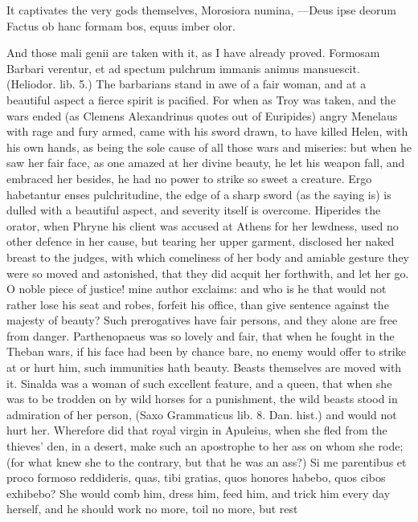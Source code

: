 {It captivates the very gods themselves, Morosiora numina,
---Deus ipse deorum
Factus ob hanc formam bos, equus imber olor.

And those mali genii are taken with it, as I have already proved.
Formosam Barbari verentur, et ad spectum pulchrum immanis animus
mansuescit. (Heliodor. lib. 5.) The barbarians stand in awe of a fair
woman, and at a beautiful aspect a fierce spirit is pacified. For when
as Troy was taken, and the wars ended (as Clemens Alexandrinus
quotes out of Euripides) angry Menelaus with rage and fury armed, came
with his sword drawn, to have killed Helen, with his own hands, as
being the sole cause of all those wars and miseries: but when he saw
her fair face, as one amazed at her divine beauty, he let his weapon
fall, and embraced her besides, he had no power to strike so sweet a
creature. Ergo habetantur enses pulchritudine, the edge of a sharp
sword (as the saying is) is dulled with a beautiful aspect, and
severity itself is overcome. Hiperides the orator, when Phryne his
client was accused at Athens for her lewdness, used no other defence in
her cause, but tearing her upper garment, disclosed her naked breast to
the judges, with which comeliness of her body and amiable gesture they
were so moved and astonished, that they did acquit her forthwith, and
let her go. O noble piece of justice! mine author exclaims: and who is
he that would not rather lose his seat and robes, forfeit his office,
than give sentence against the majesty of beauty? Such prerogatives
have fair persons, and they alone are free from danger. Parthenopaeus
was so lovely and fair, that when he fought in the Theban wars, if his
face had been by chance bare, no enemy would offer to strike at or hurt
him, such immunities hath beauty. Beasts themselves are moved with it.
Sinalda was a woman of such excellent feature, and a queen, that
when she was to be trodden on by wild horses for a punishment, the wild
beasts stood in admiration of her person, (Saxo Grammaticus lib. 8.
Dan. hist.) and would not hurt her. Wherefore did that royal virgin in
Apuleius, when she fled from the thieves' den, in a desert, make
such an apostrophe to her ass on whom she rode; (for what knew she to
the contrary, but that he was an ass?) Si me parentibus et proco
formoso reddideris, quas, tibi gratias, quos honores habebo, quos cibos
exhibebo? She would comb him, dress him, feed him, and trick him
every day herself, and he should work no more, toil no more, but rest
}
